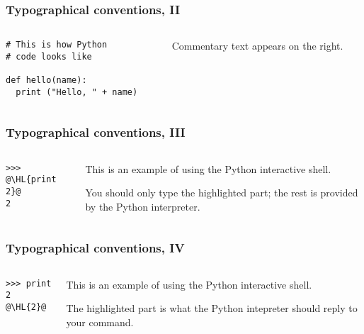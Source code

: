 \documentclass[english,serif,mathserif,xcolor=pdftex,dvipsnames,table]{beamer}
\begin{document}
\begin{frame}[fragile]
  \frametitle{Typographical conventions, II}

    \begin{columns}[t]
    \begin{column}{0.5\textwidth}
\begin{lstlisting}
# This is how Python
# code looks like

def hello(name):
  print ("Hello, " + name)
\end{lstlisting}
    \end{column}
    \begin{column}{0.5\textwidth}
      \raggedleft Commentary text appears on the right.
    \end{column}
  \end{columns}
\end{frame}


\begin{frame}[fragile]
  \frametitle{Typographical conventions, III}

    \begin{columns}[t]
    \begin{column}{0.5\textwidth}
\begin{lstlisting}
>>> @\HL{print 2}@
2
\end{lstlisting}
    \end{column}
    \begin{column}{0.5\textwidth}
      \raggedleft
      This is an example of using the Python interactive shell.

      \+
      You should only type the highlighted part; the rest is
      provided by the Python interpreter.
    \end{column}
  \end{columns}
\end{frame}


\begin{frame}[fragile]
  \frametitle{Typographical conventions, IV}

    \begin{columns}[t]
    \begin{column}{0.5\textwidth}
\begin{lstlisting}
>>> print 2
@\HL{2}@
\end{lstlisting}
    \end{column}
    \begin{column}{0.5\textwidth}
      \raggedleft
      This is an example of using the Python interactive shell.

      \+
      The highlighted part is what the Python intepreter should
      reply to your command.
    \end{column}
  \end{columns}
\end{frame}
\end{document}
